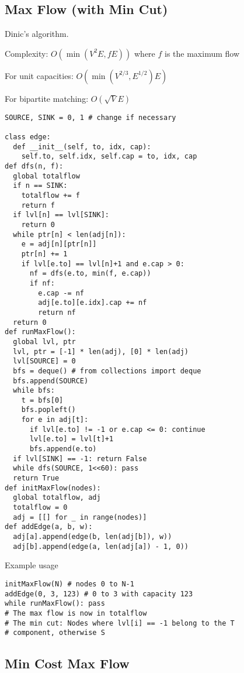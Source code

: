 \documentclass[letterpaper]{article}
\begin{document}
\subsection{Max Flow (with Min Cut)}

Dinic's algorithm.

Complexity: $O\left(\min\left(V^2E, fE\right)\right)$ where $f$ is the maximum flow

For unit capacities: $O\left(\min\left(V^{2/3}, E^{1/2}\right)E\right)$

For bipartite matching: $O\left(\sqrt VE\right)$

\begin{lstlisting}
SOURCE, SINK = 0, 1 # change if necessary

class edge:
  def __init__(self, to, idx, cap):
    self.to, self.idx, self.cap = to, idx, cap
def dfs(n, f):
  global totalflow
  if n == SINK:
    totalflow += f
    return f
  if lvl[n] == lvl[SINK]:
    return 0
  while ptr[n] < len(adj[n]):
    e = adj[n][ptr[n]]
    ptr[n] += 1
    if lvl[e.to] == lvl[n]+1 and e.cap > 0:
      nf = dfs(e.to, min(f, e.cap))
      if nf:
        e.cap -= nf
        adj[e.to][e.idx].cap += nf
        return nf
  return 0
def runMaxFlow():
  global lvl, ptr
  lvl, ptr = [-1] * len(adj), [0] * len(adj)
  lvl[SOURCE] = 0
  bfs = deque() # from collections import deque
  bfs.append(SOURCE)
  while bfs:
    t = bfs[0]
    bfs.popleft()
    for e in adj[t]:
      if lvl[e.to] != -1 or e.cap <= 0: continue
      lvl[e.to] = lvl[t]+1
      bfs.append(e.to)
  if lvl[SINK] == -1: return False
  while dfs(SOURCE, 1<<60): pass
  return True
def initMaxFlow(nodes):
  global totalflow, adj
  totalflow = 0
  adj = [[] for _ in range(nodes)]
def addEdge(a, b, w):
  adj[a].append(edge(b, len(adj[b]), w))
  adj[b].append(edge(a, len(adj[a]) - 1, 0))
\end{lstlisting}
Example usage
\begin{lstlisting}
initMaxFlow(N) # nodes 0 to N-1
addEdge(0, 3, 123) # 0 to 3 with capacity 123
while runMaxFlow(): pass
# The max flow is now in totalflow
# The min cut: Nodes where lvl[i] == -1 belong to the T
# component, otherwise S
\end{lstlisting}

\clearpage

\subsection{Min Cost Max Flow}
\end{document}
